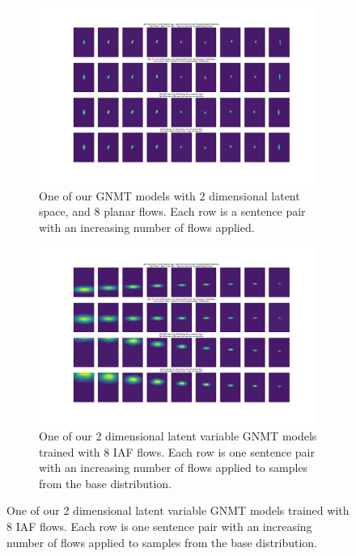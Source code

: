 \begin{figure}
	\centering
	\begin{subfigure}[b]{\textwidth}
		\centering
		\includegraphics[width=\textwidth]{vaenmt_planar_flows_plot.pdf}
		\caption{One of our \ac{GNMT} models with 2 dimensional latent space, and 8 planar flows. Each row is a sentence pair with an increasing number of flows applied. }
		\label{fig:gnmt_planar}
	\end{subfigure}
	\hfill
	\begin{subfigure}[b]{\textwidth}
		\centering
		\includegraphics[width=\textwidth]{vaenmt_iaf_flows_plot.pdf}
		\caption{One of our 2 dimensional latent variable \ac{GNMT}  models trained with 8 \ac{IAF} flows. Each row is one sentence pair with an increasing number of flows applied to samples from the base distribution. }
		\label{fig:gnmt_iaf}
	\end{subfigure}
\end{figure}

